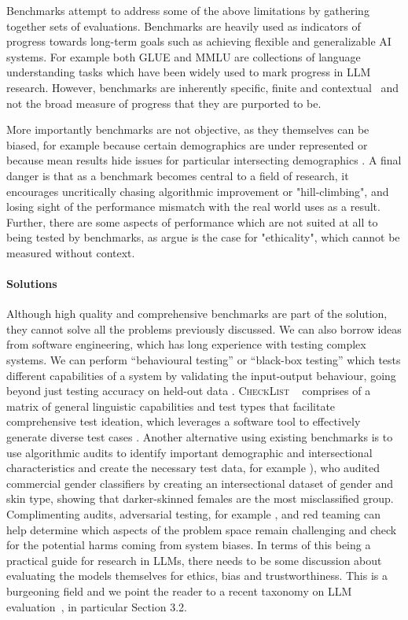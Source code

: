 Benchmarks attempt to address some of the above limitations by gathering together sets of evaluations. 
Benchmarks are heavily used as indicators of progress towards long-term goals such as achieving flexible and generalizable AI systems.  For example both GLUE and MMLU are collections of language understanding tasks which have been widely used to mark progress in LLM research. 
However, benchmarks are inherently specific, finite and contextual~\citep{raji_ai_2021} and not the broad measure of progress that they are purported to be. 

More importantly benchmarks are not objective, as they themselves can be biased, for example because certain demographics are under represented \citep{buolamwini_gender_2018} or because mean results hide issues for particular intersecting demographics \citep{tatman_gender_2017}. A final danger is that as a benchmark becomes central to a field of research, it encourages uncritically chasing algorithmic improvement or "hill-climbing", and losing sight of the performance mismatch with the real world uses as a result.  Further, there are some aspects of performance which are not suited at all to being tested by benchmarks, as \citet{lacroix_metaethical_2022} argue is the case for "ethicality", which cannot be measured without context. 


\paragraph{Solutions}

Although high quality and comprehensive benchmarks are part of the solution, they cannot solve all the problems previously discussed. We can also borrow ideas from software engineering, which has long experience with testing complex systems. 
We can perform ``behavioural testing'' or ``black-box testing'' which tests different capabilities of a system by validating the input-output behaviour, going   beyond just testing accuracy on held-out data \citep{ribeiro_beyond_2020}. \textsc{CheckList} ~\citep{ribeiro_beyond_2020} comprises of a matrix of general linguistic capabilities and test types that facilitate comprehensive test ideation, which leverages a software tool to effectively generate diverse test cases \citep[see also][]{manerba_fine-grained_2021}. 
Another alternative using existing benchmarks is to use algorithmic audits to identify important demographic and intersectional characteristics and create the necessary test data, for example \citet{buolamwini_gender_2018}), who audited commercial gender classifiers by creating an intersectional dataset of gender and skin type, showing that darker-skinned females are the
most misclassified group.  
Complimenting audits, adversarial testing, for example \citet{niven-kao-2019-probing}, and red teaming \citep{ganguli_red_2022} can
help determine which aspects of the problem space remain challenging and check for the
potential harms coming from system biases.
In terms of this being a practical guide for research in LLMs, there needs to be some discussion about evaluating the models themselves for ethics, bias and trustworthiness. 
This is a burgeoning field and we point the reader to a recent taxonomy on LLM evaluation~\cite{chang_survey_2023}, in particular Section 3.2.  


